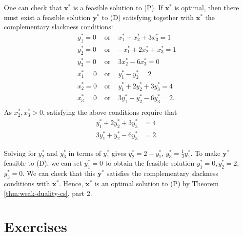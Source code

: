 \documentclass[]{book}
\def\gt{>}
\renewcommand{\vec}[1]{\mathbf{#1}}
\theoremstyle{definition}
\theoremstyle{definition}
\theoremstyle{remark}
\begin{document}
One can check that \(\vec{x}^*\) is a feasible solution to (P). If
\(\vec{x}^*\) is optimal, then there must exist a feasible solution
\(\vec{y}^*\) to (D) satisfying together with \(\vec{x}^*\) the
complementary slackness conditions: \[
\begin{array}{llr}
 y_1^* = 0 & \mbox{ or } &  x_1^* + x_2^* + 3x_3^* = 1 \\
 y_2^* = 0 & \mbox{ or } & -x_1^* + 2x_2^* + x_3^* = 1 \\
 y_3^* = 0 & \mbox{ or } &   3x_2^* - 6x_3^*  = 0 \\
 x_1^* = 0 & \mbox{ or } &  y_1^* -  y_2^*  =  2 \\
 x_2^* = 0 & \mbox{ or } &  y_1^*  + 2y_2^* + 3y_3^*  =  4 \\
 x_3^* = 0 & \mbox{ or } & 3y_1^*  + y_2^* - 6y_3^*  =  2. \\
\end{array}
\] As \(x_2^*, x_3^* \gt 0\), satisfying the above conditions require
that
\begin{align*} 
  y_1^*  + 2y_2^* + 3y_3^* &= 4  \\
  3y_1^*  + y_2^* - 6y_3^* &=  2.
\end{align*}

Solving for \(y_2^*\) and \(y_3^*\) in terms of \(y_1^*\) gives
\(y_2^* = 2 - y_1^*\), \(y_3^* = \frac{1}{3}y_1^*\). To make
\(\vec{y}^*\) feasible to (D), we can set \(y_1^* = 0\) to obtain the
feasible solution \(y_1^* = 0, y_2^* = 2\), \(y_3^* = 0\). We can check
that this \(\vec{y}^*\) satisfies the complementary slackness conditions
with \(\vec{x}^*\). Hence, \(\vec{x}^*\) is an optimal solution to (P)
by Theorem \ref{thm:weak-duality-cs}, part 2.

\section*{Exercises}\label{exercises-7}
\end{document}
